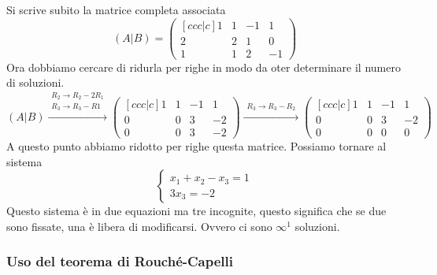 Si scrive subito la matrice completa associata
\begin{equation*}
  (A\vert B) =
  \begin{pmatrix}[ccc|c]
    1 & 1 & -1 & 1\\
    2 & 2 & 1 & 0\\
    1 & 1 & 2 & -1
  \end{pmatrix}
\end{equation*}
Ora dobbiamo cercare di ridurla per righe in modo da oter determinare il numero di
soluzioni.
\begin{equation*}
  (A\vert B)\xrightarrow{\substack{R_2\to R_2-2R_1\\R_3\to R_3-R1}}
  \begin{pmatrix}[ccc|c]
    1 & 1 & -1 & 1\\
    0 & 0 & 3 & -2\\
    0 & 0 & 3 & -2
  \end{pmatrix}\xrightarrow{\substack{R_3\to R_3-R_2}}
  \begin{pmatrix}[ccc|c]
    1 & 1 & -1 & 1\\
    0 & 0 & 3 & -2\\
    0 & 0 & 0 & 0
  \end{pmatrix}
\end{equation*}
A questo punto abbiamo ridotto per righe questa matrice. Possiamo tornare al sistema
\begin{equation*}
  \begin{cases}
    x_1+x_2-x_3=1\\
    3x_3=-2
  \end{cases}
\end{equation*}
Questo sistema è in due equazioni ma tre incognite, questo significa che se due sono
fissate, una è libera di modificarsi. Ovvero ci sono $\infty^1$ soluzioni.

\subsubsection{Uso del teorema di Rouché-Capelli}%
\label{sub:uso_del_teorema_di_rouche_capelli}

